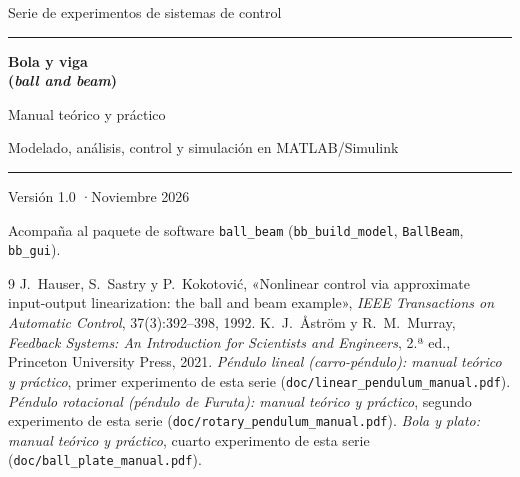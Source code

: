 \documentclass[11pt,a4paper,openany]{report}
\newcounter{practica}
\newcommand{\code}[1]{\texttt{#1}}
\begin{document}
\begin{titlepage}
\centering
\vspace*{1.2cm}
{\large Serie de experimentos de sistemas de control\par}
\vspace{0.4cm}
{\color{c1}\rule{\linewidth}{1.2pt}\par}
\vspace{0.4cm}
{\Huge\bfseries Bola y viga\\[0.2em] (\emph{ball and beam})\par}
\vspace{0.4cm}
{\Large Manual teórico y práctico\par}
\vspace{0.2cm}
{\large Modelado, análisis, control y simulación en MATLAB/Simulink\par}
{\color{c1}\rule{\linewidth}{1.2pt}\par}
\vspace{1.0cm}

\vfill
{\large Versión 1.0 \quad·\quad Noviembre 2026\par}
\vspace{0.6cm}
{\small Acompaña al paquete de software \code{ball\_beam} (\code{bb\_build\_model}, \code{BallBeam}, \code{bb\_gui}).\par}
\end{titlepage}

\tableofcontents
\listoffigures










\appendix


\begin{thebibliography}{9}
 J.~Hauser, S.~Sastry y P.~Kokotović, «Nonlinear control via approximate input-output linearization: the ball and beam example», \emph{IEEE Transactions on Automatic Control}, 37(3):392--398, 1992.
 K.~J.~Åström y R.~M.~Murray, \emph{Feedback Systems: An Introduction for Scientists and Engineers}, 2.ª ed., Princeton University Press, 2021.
 \emph{Péndulo lineal (carro-péndulo): manual teórico y práctico}, primer experimento de esta serie (\code{doc/linear\_pendulum\_manual.pdf}).
 \emph{Péndulo rotacional (péndulo de Furuta): manual teórico y práctico}, segundo experimento de esta serie (\code{doc/rotary\_pendulum\_manual.pdf}).
 \emph{Bola y plato: manual teórico y práctico}, cuarto experimento de esta serie (\code{doc/ball\_plate\_manual.pdf}).
\end{thebibliography}
\end{document}
